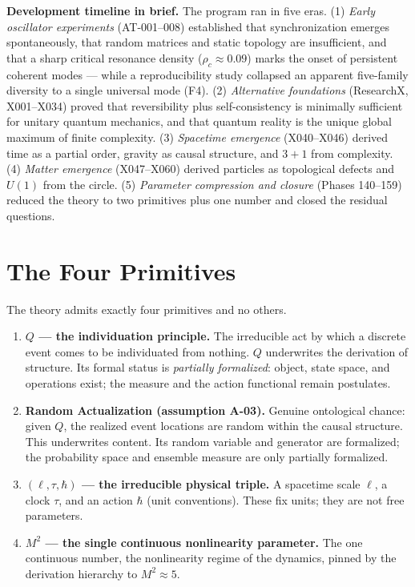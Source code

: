 \documentclass[10pt,a4paper]{article}
\begin{document}
\textbf{Development timeline in brief.} The program ran in five eras. (1) \emph{Early
oscillator experiments} (AT-001--008) established that synchronization emerges
spontaneously, that random matrices and static topology are insufficient, and that a sharp
critical resonance density ($\rho_c\approx0.09$) marks the onset of persistent coherent
modes --- while a reproducibility study collapsed an apparent five-family diversity to a
single universal mode (F4). (2) \emph{Alternative foundations} (ResearchX, X001--X034)
proved that reversibility plus self-consistency is minimally sufficient for unitary quantum
mechanics, and that quantum reality is the unique global maximum of finite complexity.
(3) \emph{Spacetime emergence} (X040--X046) derived time as a partial order, gravity as
causal structure, and $3{+}1$ from complexity. (4) \emph{Matter emergence} (X047--X060)
derived particles as topological defects and $U(1)$ from the circle. (5) \emph{Parameter
compression and closure} (Phases 140--159) reduced the theory to two primitives plus one
number and closed the residual questions.

\section{The Four Primitives}

The theory admits exactly four primitives and no others.

\begin{enumerate}
\item \textbf{$Q$ --- the individuation principle.} The irreducible act by which a discrete
event comes to be individuated from nothing. $Q$ underwrites the derivation of structure.
Its formal status is \emph{partially formalized}: object, state space, and operations
exist; the measure and the action functional remain postulates.
\item \textbf{Random Actualization (assumption A-03).} Genuine ontological chance: given
$Q$, the realized event locations are random within the causal structure. This underwrites
content. Its random variable and generator are formalized; the probability space and
ensemble measure are only partially formalized.
\item \textbf{$(\ell,\tau,\hbar)$ --- the irreducible physical triple.} A spacetime scale
$\ell$, a clock $\tau$, and an action $\hbar$ (unit conventions). These fix units; they
are not free parameters.
\item \textbf{$M^2$ --- the single continuous nonlinearity parameter.} The one continuous
number, the nonlinearity regime of the dynamics, pinned by the derivation hierarchy to
$M^2\approx 5$.
\end{enumerate}
\end{document}

